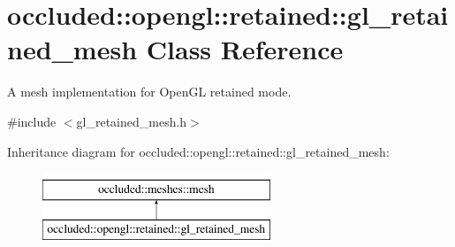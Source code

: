 \hypertarget{classoccluded_1_1opengl_1_1retained_1_1gl__retained__mesh}{\section{occluded\+:\+:opengl\+:\+:retained\+:\+:gl\+\_\+retained\+\_\+mesh Class Reference}
\label{classoccluded_1_1opengl_1_1retained_1_1gl__retained__mesh}
}


A mesh implementation for Open\+G\+L retained mode.  




{\ttfamily \#include $<$gl\+\_\+retained\+\_\+mesh.\+h$>$}

Inheritance diagram for occluded\+:\+:opengl\+:\+:retained\+:\+:gl\+\_\+retained\+\_\+mesh\+:\begin{figure}[H]
\begin{center}
\leavevmode
\includegraphics[height=2.000000cm]{classoccluded_1_1opengl_1_1retained_1_1gl__retained__mesh}
\end{center}
\end{figure}

